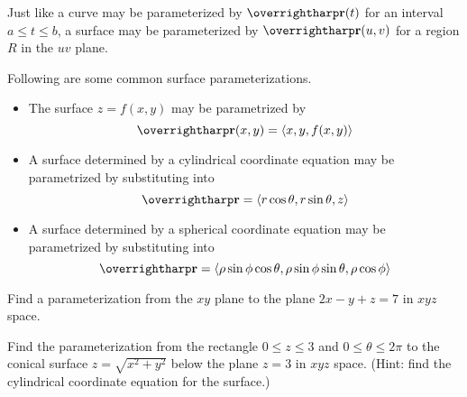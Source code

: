 \documentclass[letterpaper, twoside, 12pt]{book}
\begin{document}
\begin{remark}
  Just like a curve may be parameterized by $\vect{r}(t)$
  for an interval $a\leq t\leq b$, a surface may be parameterized by
  $\vect{r}(u,v)$ for a region $R$ in the $uv$ plane.
\end{remark}

\begin{theorem}
  Following are some common surface parameterizations.
  \begin{itemize}
    \item The surface $z=f(x,y)$ may be parametrized by
      \[
        \vect{r}(x,y) = \<x,y,f(x,y)\>
      \]
    \item A surface determined by a cylindrical coordinate equation may
    be parametrized by substituting into
      \[
        \vect{r} = \<r\cos\theta, r\sin\theta, z\>
      \]
    \item A surface determined by a spherical coordinate equation may
    be parametrized by substituting into
      \[
        \vect{r} =
        \<\rho\sin\phi\cos\theta,
        \rho\sin\phi\sin\theta,
        \rho\cos\phi \>
      \]
  \end{itemize}
\end{theorem}

          \begin{problem}
            Find a parameterization from the $xy$ plane to the
            plane $2x-y+z=7$ in $xyz$ space.
          \end{problem}

          \begin{solution}

          \end{solution}

          \begin{contributors}

          \end{contributors}

          \begin{problem}
            Find the parameterization from the rectangle $0\leq z\leq 3$
            and $0\leq\theta\leq2\pi$ to the conical surface $z=\sqrt{x^2+y^2}$
            below the plane $z=3$ in $xyz$ space. (Hint: find the cylindrical
            coordinate equation for the surface.)
          \end{problem}

          \begin{solution}

          \end{solution}
\end{document}
